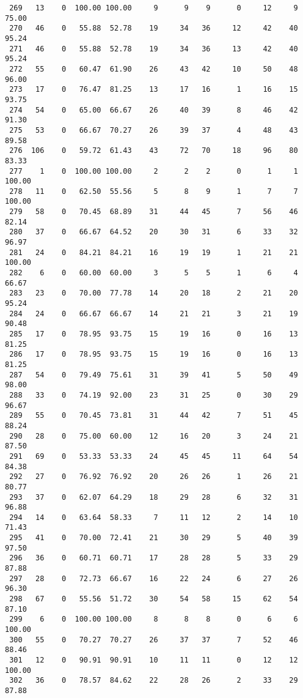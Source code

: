 \begin{verbatim}
 269   13    0  100.00 100.00     9      9    9      0     12     9    75.00
 270   46    0   55.88  52.78    19     34   36     12     42    40    95.24
 271   46    0   55.88  52.78    19     34   36     13     42    40    95.24
 272   55    0   60.47  61.90    26     43   42     10     50    48    96.00
 273   17    0   76.47  81.25    13     17   16      1     16    15    93.75
 274   54    0   65.00  66.67    26     40   39      8     46    42    91.30
 275   53    0   66.67  70.27    26     39   37      4     48    43    89.58
 276  106    0   59.72  61.43    43     72   70     18     96    80    83.33
 277    1    0  100.00 100.00     2      2    2      0      1     1   100.00
 278   11    0   62.50  55.56     5      8    9      1      7     7   100.00
 279   58    0   70.45  68.89    31     44   45      7     56    46    82.14
 280   37    0   66.67  64.52    20     30   31      6     33    32    96.97
 281   24    0   84.21  84.21    16     19   19      1     21    21   100.00
 282    6    0   60.00  60.00     3      5    5      1      6     4    66.67
 283   23    0   70.00  77.78    14     20   18      2     21    20    95.24
 284   24    0   66.67  66.67    14     21   21      3     21    19    90.48
 285   17    0   78.95  93.75    15     19   16      0     16    13    81.25
 286   17    0   78.95  93.75    15     19   16      0     16    13    81.25
 287   54    0   79.49  75.61    31     39   41      5     50    49    98.00
 288   33    0   74.19  92.00    23     31   25      0     30    29    96.67
 289   55    0   70.45  73.81    31     44   42      7     51    45    88.24
 290   28    0   75.00  60.00    12     16   20      3     24    21    87.50
 291   69    0   53.33  53.33    24     45   45     11     64    54    84.38
 292   27    0   76.92  76.92    20     26   26      1     26    21    80.77
 293   37    0   62.07  64.29    18     29   28      6     32    31    96.88
 294   14    0   63.64  58.33     7     11   12      2     14    10    71.43
 295   41    0   70.00  72.41    21     30   29      5     40    39    97.50
 296   36    0   60.71  60.71    17     28   28      5     33    29    87.88
 297   28    0   72.73  66.67    16     22   24      6     27    26    96.30
 298   67    0   55.56  51.72    30     54   58     15     62    54    87.10
 299    6    0  100.00 100.00     8      8    8      0      6     6   100.00
 300   55    0   70.27  70.27    26     37   37      7     52    46    88.46
 301   12    0   90.91  90.91    10     11   11      0     12    12   100.00
 302   36    0   78.57  84.62    22     28   26      2     33    29    87.88

\end{verbatim}
